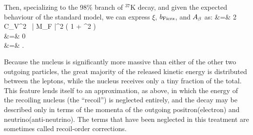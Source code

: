 




Then, specializing to the 98\% branch of $^{37}$K decay, and given the expected behaviour of the standard model,
we can express $\xi$, $b_{\mathrm{Fierz}}$, and $A_{\beta}$ as:
\bea
\xi &=& 2 \,\, C_V^2 \, | M_F |^2 \left( 1 + \rho^2 \right)
\label{eq:xiwithrho_intro} 
\\
\bFierz &=& 0 
\label{bFierzwithrho_intro}
\\
\Abeta &=& .
\label{eq:Awithrho_intro}
\eea



Because the nucleus is significantly more massive than either of the other two outgoing particles, the great majority of the released kinetic energy is distributed between the leptons, while the nucleus receives only a tiny fraction of the total.  This feature lends itself to an approximation, as above, in which the energy of the recoiling nucleus (the ``recoil'') is neglected entirely, and the decay may be described only in terms of the momenta of the outgoing positron(electron) and neutrino(anti-neutrino).  
The terms that have been neglected in this treatment are sometimes called recoil-order corrections.

